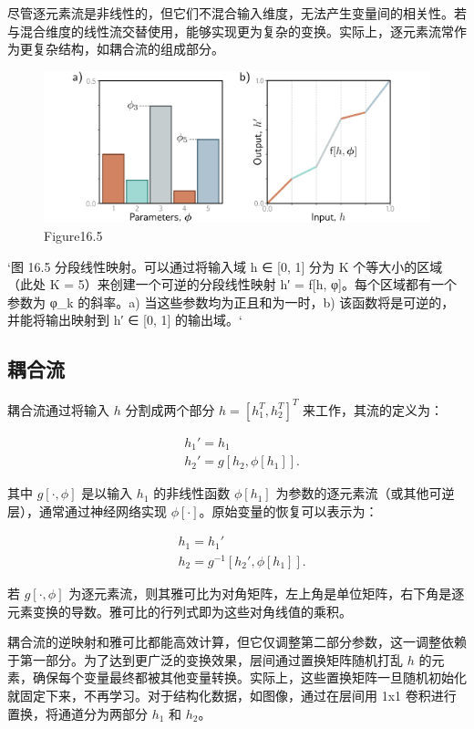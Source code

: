 尽管逐元素流是非线性的，但它们不混合输入维度，无法产生变量间的相关性。若与混合维度的线性流交替使用，能够实现更为复杂的变换。实际上，逐元素流常作为更复杂结构，如耦合流的组成部分。

\begin{figure}[h!]
\centering
\includegraphics[width=0.7\linewidth]{png/chapter16/FlowPiecewiseLinear.png}
\caption{Figure16.5}
\end{figure}

`图 16.5 分段线性映射。可以通过将输入域 h ∈ [0, 1] 分为 K 个等大小的区域（此处 K = 5）来创建一个可逆的分段线性映射 h′ = f[h, φ]。每个区域都有一个参数为 φ_k 的斜率。a) 当这些参数均为正且和为一时，b) 该函数将是可逆的，并能将输出映射到 h′ ∈ [0, 1] 的输出域。`

\subsection{耦合流}
耦合流通过将输入 \(h\) 分割成两个部分 \(h = [h_1^T, h_2^T]^T\) 来工作，其流的定义为：

\begin{align}
&h_1' = h_1 \\
&h_2' = g[h_2, \phi[h_1]].
\end{align} 


其中 \(g[\cdot, \phi]\) 是以输入 \(h_1\) 的非线性函数 \(\phi[h_1]\) 为参数的逐元素流（或其他可逆层），通常通过神经网络实现 \(\phi[\cdot]\)。原始变量的恢复可以表示为：


\begin{align}
&h_1 = h_1' \\
&h_2 = g^{-1}[h_2', \phi[h_1]].
\end{align} 


若 \(g[\cdot, \phi]\) 为逐元素流，则其雅可比为对角矩阵，左上角是单位矩阵，右下角是逐元素变换的导数。雅可比的行列式即为这些对角线值的乘积。

耦合流的逆映射和雅可比都能高效计算，但它仅调整第二部分参数，这一调整依赖于第一部分。为了达到更广泛的变换效果，层间通过置换矩阵随机打乱 \(h\) 的元素，确保每个变量最终都被其他变量转换。实际上，这些置换矩阵一旦随机初始化就固定下来，不再学习。对于结构化数据，如图像，通过在层间用 1x1 卷积进行置换，将通道分为两部分 \(h_1\) 和 \(h_2\)。

